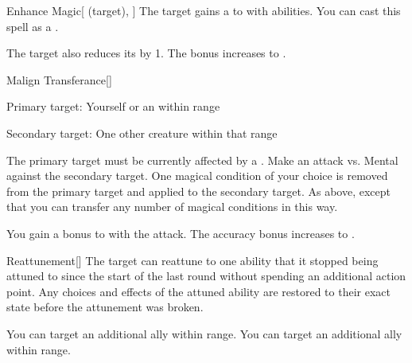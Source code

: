 \lowercase{\hypertarget{spell:Enhance Magic}{}}\label{spell:Enhance Magic}
\begin{attuneability}[Rank 3]{\hypertarget{spell:Enhance Magic}{Enhance Magic}}[ (target), ]
The target gains a   to  with  abilities.
You can cast this spell as a .

\rankline
{} The target also reduces its  by 1.
 The bonus increases to .
\end{attuneability}
\vspace{0.25em}



\lowercase{\hypertarget{spell:Malign Transferance}{}}\label{spell:Malign Transferance}
\begin{freeability}[Rank 3]{\hypertarget{spell:Malign Transferance}{Malign Transferance}}[]

Primary target: Yourself or an  within \rngmed range
\par\noindent
Secondary target: One other creature within that range

The primary target must be currently affected by a  .
Make an attack vs. Mental against the secondary target.
\hit One magical condition of your choice is removed from the primary target and applied to the secondary target.
\crit As above, except that you can transfer any number of magical conditions in this way.

\rankline
{} You gain a  bonus to  with the attack.
 The accuracy bonus increases to .
\end{freeability}
\vspace{0.25em}



\lowercase{\hypertarget{spell:Reattunement}{}}\label{spell:Reattunement}
\begin{freeability}[Rank 3]{\hypertarget{spell:Reattunement}{Reattunement}}[]
The target can reattune to one ability that it stopped being attuned to since the start of the last round without spending an additional action point.
Any choices and effects of the attuned ability are restored to their exact state before the attunement was broken.

\rankline
{} You can target an additional ally within range.
 You can target an additional ally within range.
\end{freeability}
\vspace{0.25em}



